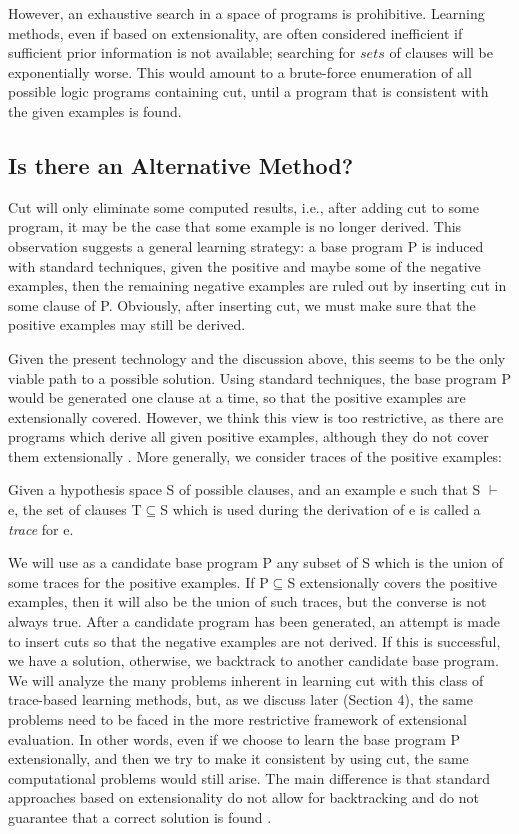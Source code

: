 However, an exhaustive search in a space of programs is 
prohibitive. Learning methods, even if based on 
extensionality, are often considered inefficient if
sufficient prior information is not available; searching
for $sets$ of clauses will be exponentially worse.
This would amount to a brute-force enumeration of
all possible logic programs containing cut, until
a program that is consistent with the given examples is found.
 
\subsection{Is there an Alternative Method?}
 
Cut will only eliminate some computed results, i.e., after
adding cut to some program, it may be the case that some 
example is no longer derived. This observation suggests a
general learning strategy: a base program P is induced
with standard techniques, given the positive and maybe
some of the negative examples, then the remaining negative
examples are ruled out by inserting cut in some clause of P.
Obviously, after inserting cut, we must make sure that the
positive examples may still be derived.
 
Given the present technology and the discussion above, this
seems to be the only viable path to a possible solution.
Using standard techniques, the base program P would be generated
one clause at a time, so that the positive examples are
extensionally covered. However, we think this view is too restrictive,
as there are programs which derive all given positive
examples, although they do not cover them extensionally
\cite{bergtkde93,deraijca93}. 
More generally, we consider
traces of the positive examples:
 
\begin{newdef}
Given a hypothesis space S of possible clauses, and
an example e such that S $\vdash$ e, the set of
clauses T$\subseteq$S which is used during the derivation of e
is called a {\em trace} for e.
\end{newdef}
 
We will use as a candidate base program P any subset of
S which is the union of some traces for the positive examples.
If P$\subseteq$S extensionally covers the positive examples,
then it will also be the union of such traces, but the
converse is not always true. After a candidate program has
been generated, an attempt is made to insert cuts so that
the negative examples are not derived. If this is successful,
we have a solution, otherwise, we backtrack to another
candidate base program. We will analyze the many problems inherent in
learning cut with this class of trace-based learning methods,
but, as we discuss later (Section 4),
the same problems need to be faced
in the more restrictive framework of extensional evaluation.
In other words, even if we choose to learn the base program 
P extensionally, and then we try to make it consistent by
using cut, the same computational problems would still arise.
The main difference is that standard
approaches based on extensionality do not allow for backtracking
and do not guarantee that a correct solution is found \cite{bergtkde93}.
 
